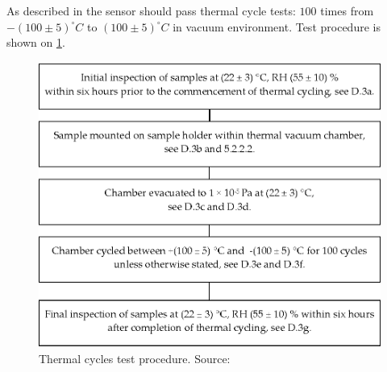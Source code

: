 	As described in \cite{ECSS_Q_ST_70_04C} the sensor should pass thermal cycle tests: $100$ times from $- (100 \pm 5)^\circ C$ to $(100 \pm 5)^\circ C$ in vacuum environment. Test procedure is shown on \ref{thermal_tests}.
	
	\begin{figure}[H]
		\centering
		\includegraphics[width=0.5\paperwidth]{img/thermal_cycles.eps}
		\caption{Thermal cycles test procedure. Source: \cite{ECSS_Q_ST_70_04C}}
		\label{thermal_tests}
	\end{figure}
